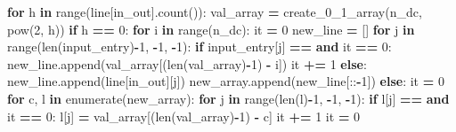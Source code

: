 \documentclass[
  italian,
]{book}
\newenvironment{Shaded}{\begin{snugshade}}{\end{snugshade}}
\newcommand{\BuiltInTok}[1]{#1}
\newcommand{\ControlFlowTok}[1]{\textcolor[rgb]{0.13,0.29,0.53}{\textbf{#1}}}
\newcommand{\DecValTok}[1]{\textcolor[rgb]{0.00,0.00,0.81}{#1}}
\newcommand{\KeywordTok}[1]{\textcolor[rgb]{0.13,0.29,0.53}{\textbf{#1}}}
\newcommand{\NormalTok}[1]{#1}
\newcommand{\OperatorTok}[1]{\textcolor[rgb]{0.81,0.36,0.00}{\textbf{#1}}}
\newcommand{\StringTok}[1]{\textcolor[rgb]{0.31,0.60,0.02}{#1}}
\begin{document}
\begin{Shaded}
\begin{Highlighting}[]
    \ControlFlowTok{for}\NormalTok{ h }\KeywordTok{in} \BuiltInTok{range}\NormalTok{(line[in\_out].count(}\StringTok{\textquotesingle{}{-}\textquotesingle{}}\NormalTok{)):}
\NormalTok{        val\_array }\OperatorTok{=}\NormalTok{ create\_0\_1\_array(n\_dc, }\BuiltInTok{pow}\NormalTok{(}\DecValTok{2}\NormalTok{, h))}
        \ControlFlowTok{if}\NormalTok{ h }\OperatorTok{==} \DecValTok{0}\NormalTok{:}
            \ControlFlowTok{for}\NormalTok{ i }\KeywordTok{in} \BuiltInTok{range}\NormalTok{(n\_dc):}
\NormalTok{                it }\OperatorTok{=} \DecValTok{0}
\NormalTok{                new\_line }\OperatorTok{=}\NormalTok{ []}
                \ControlFlowTok{for}\NormalTok{ j }\KeywordTok{in} \BuiltInTok{range}\NormalTok{(}\BuiltInTok{len}\NormalTok{(input\_entry)}\OperatorTok{{-}}\DecValTok{1}\NormalTok{, }\OperatorTok{{-}}\DecValTok{1}\NormalTok{, }\OperatorTok{{-}}\DecValTok{1}\NormalTok{):}
                    \ControlFlowTok{if}\NormalTok{ input\_entry[j] }\OperatorTok{==} \StringTok{\textquotesingle{}{-}\textquotesingle{}} \KeywordTok{and}\NormalTok{ it }\OperatorTok{==} \DecValTok{0}\NormalTok{:}
\NormalTok{                        new\_line.append(val\_array[(}\BuiltInTok{len}\NormalTok{(val\_array)}\OperatorTok{{-}}\DecValTok{1}\NormalTok{) }\OperatorTok{{-}}\NormalTok{ i])}
\NormalTok{                        it }\OperatorTok{+=} \DecValTok{1}
                    \ControlFlowTok{else}\NormalTok{:}
\NormalTok{                        new\_line.append(line[in\_out][j])}
\NormalTok{                new\_array.append(new\_line[::}\OperatorTok{{-}}\DecValTok{1}\NormalTok{])}
        \ControlFlowTok{else}\NormalTok{:}
\NormalTok{            it }\OperatorTok{=} \DecValTok{0}
            \ControlFlowTok{for}\NormalTok{ c, l }\KeywordTok{in} \BuiltInTok{enumerate}\NormalTok{(new\_array):}
                \ControlFlowTok{for}\NormalTok{ j }\KeywordTok{in} \BuiltInTok{range}\NormalTok{(}\BuiltInTok{len}\NormalTok{(l)}\OperatorTok{{-}}\DecValTok{1}\NormalTok{, }\OperatorTok{{-}}\DecValTok{1}\NormalTok{, }\OperatorTok{{-}}\DecValTok{1}\NormalTok{):}
                    \ControlFlowTok{if}\NormalTok{ l[j] }\OperatorTok{==} \StringTok{\textquotesingle{}{-}\textquotesingle{}} \KeywordTok{and}\NormalTok{ it }\OperatorTok{==} \DecValTok{0}\NormalTok{:}
\NormalTok{                        l[j] }\OperatorTok{=}\NormalTok{ val\_array[(}\BuiltInTok{len}\NormalTok{(val\_array)}\OperatorTok{{-}}\DecValTok{1}\NormalTok{) }\OperatorTok{{-}}\NormalTok{ c]}
\NormalTok{                        it }\OperatorTok{+=} \DecValTok{1}
\NormalTok{                it }\OperatorTok{=} \DecValTok{0}


\end{Highlighting}
\end{Shaded}
\end{document}
